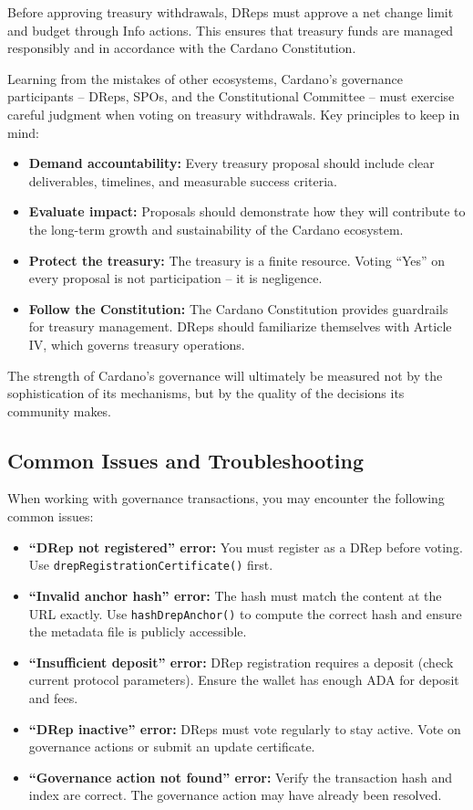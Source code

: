 Before approving treasury withdrawals, DReps must approve a net change limit and budget through Info actions. This ensures that treasury funds are managed responsibly and in accordance with the Cardano Constitution.

Learning from the mistakes of other ecosystems, Cardano's governance participants -- DReps, SPOs, and the Constitutional Committee -- must exercise careful judgment when voting on treasury withdrawals. Key principles to keep in mind:

\begin{itemize}
    \item \textbf{Demand accountability:} Every treasury proposal should include clear deliverables, timelines, and measurable success criteria.
    \item \textbf{Evaluate impact:} Proposals should demonstrate how they will contribute to the long-term growth and sustainability of the Cardano ecosystem.
    \item \textbf{Protect the treasury:} The treasury is a finite resource. Voting ``Yes'' on every proposal is not participation -- it is negligence.
    \item \textbf{Follow the Constitution:} The Cardano Constitution provides guardrails for treasury management. DReps should familiarize themselves with Article IV, which governs treasury operations.
\end{itemize}

The strength of Cardano's governance will ultimately be measured not by the sophistication of its mechanisms, but by the quality of the decisions its community makes.

\subsection{Common Issues and Troubleshooting}

When working with governance transactions, you may encounter the following common issues:

\begin{itemize}
    \item \textbf{``DRep not registered'' error:} You must register as a DRep before voting. Use \texttt{drepRegistrationCertificate()} first.
    \item \textbf{``Invalid anchor hash'' error:} The hash must match the content at the URL exactly. Use \texttt{hashDrepAnchor()} to compute the correct hash and ensure the metadata file is publicly accessible.
    \item \textbf{``Insufficient deposit'' error:} DRep registration requires a deposit (check current protocol parameters). Ensure the wallet has enough ADA for deposit and fees.
    \item \textbf{``DRep inactive'' error:} DReps must vote regularly to stay active. Vote on governance actions or submit an update certificate.
    \item \textbf{``Governance action not found'' error:} Verify the transaction hash and index are correct. The governance action may have already been resolved.
\end{itemize}

